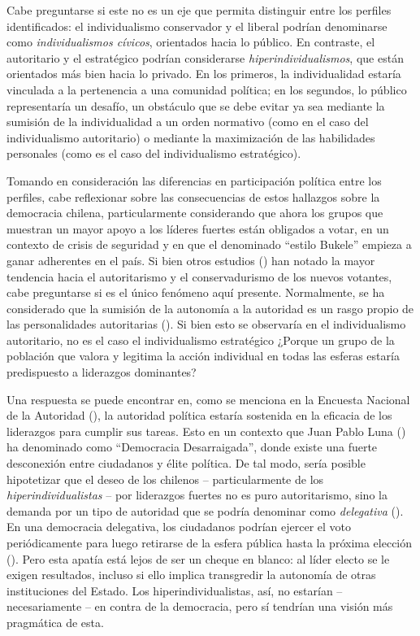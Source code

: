 \documentclass[
  letterpaper,
  DIV=11,
  numbers=noendperiod]{scrartcl}
\begin{document}
Cabe preguntarse si este no es un eje que permita distinguir entre los
perfiles identificados: el individualismo conservador y el liberal
podrían denominarse como \emph{individualismos cívicos}, orientados
hacia lo público. En contraste, el autoritario y el estratégico podrían
considerarse \emph{hiperindividualismos}, que están orientados más bien
hacia lo privado. En los primeros, la individualidad estaría vinculada a
la pertenencia a una comunidad política; en los segundos, lo público
representaría un desafío, un obstáculo que se debe evitar ya sea
mediante la sumisión de la individualidad a un orden normativo (como en
el caso del individualismo autoritario) o mediante la maximización de
las habilidades personales (como es el caso del individualismo
estratégico).

Tomando en consideración las diferencias en participación política entre
los perfiles, cabe reflexionar sobre las consecuencias de estos
hallazgos sobre la democracia chilena, particularmente considerando que
ahora los grupos que muestran un mayor apoyo a los líderes fuertes están
obligados a votar, en un contexto de crisis de seguridad y en que el
denominado ``estilo Bukele'' empieza a ganar adherentes en el país. Si
bien otros estudios () han notado la
mayor tendencia hacia el autoritarismo y el conservadurismo de los
nuevos votantes, cabe preguntarse si es el único fenómeno aquí presente.
Normalmente, se ha considerado que la sumisión de la autonomía a la
autoridad es un rasgo propio de las personalidades autoritarias
(). Si bien esto se
observaría en el individualismo autoritario, no es el caso el
individualismo estratégico ¿Porque un grupo de la población que valora y
legitima la acción individual en todas las esferas estaría predispuesto
a liderazgos dominantes?

Una respuesta se puede encontrar en, como se menciona en la Encuesta
Nacional de la Autoridad (), la autoridad política estaría sostenida en la eficacia de los
liderazgos para cumplir sus tareas. Esto en un contexto que Juan Pablo
Luna () ha denominado como ``Democracia
Desarraigada'', donde existe una fuerte desconexión entre ciudadanos y
élite política. De tal modo, sería posible hipotetizar que el deseo de
los chilenos -- particularmente de los \emph{hiperindividualistas} --
por liderazgos fuertes no es puro autoritarismo, sino la demanda por un
tipo de autoridad que se podría denominar como \emph{delegativa}
(). En una democracia
delegativa, los ciudadanos podrían ejercer el voto periódicamente para
luego retirarse de la esfera pública hasta la próxima elección
(). Pero esta apatía está
lejos de ser un cheque en blanco: al líder electo se le exigen
resultados, incluso si ello implica transgredir la autonomía de otras
instituciones del Estado. Los hiperindividualistas, así, no estarían --
necesariamente -- en contra de la democracia, pero sí tendrían una
visión más pragmática de esta.
\end{document}
